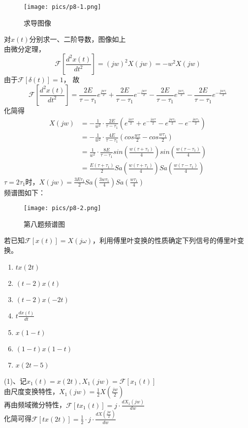 \documentclass[answers]{exam}  %
\begin{document}
\begin{questions}
\begin{figure}[h]
	\centering
	\texttt{[image: pics/p8-1.png]}
	\caption{求导图像}
\end{figure}
\begin{solution}
	对$x(t)$分别求一、二阶导数，图像如上\\
	由微分定理，$$\mathcal{F}[\frac{d^2x(t)}{dt^2}]=(jw)^2X(jw)=-w^2X(jw)$$
	由于$\mathcal{F}[\delta(t)]=1$，
	故$$\mathcal{F}[\frac{d^2x(t)}{dt^2}]=\frac{2E}{\tau-\tau_1}e^{\frac{jw\tau}{2}}+\frac{2E}{\tau-\tau_1}e^{-\frac
	{jw\tau}{2}}-\frac{2E}{\tau-\tau_1}e^{\frac{jw\tau_1}{2}}-\frac{2E}{\tau-\tau_1}e^{-\frac{jw\tau_1}{2}}$$
	化简得\begin{align*}
		X(jw)&=-\frac{1}{w^2}\cdot\frac{2E}{\tau-\tau_1}(e^{\frac{jw\tau}{2}}+e^{-\frac{jw\tau}{2}}-e^{\frac{jw\tau_1}{2}}-e^{-\frac{jw\tau_1}{2}})\\
		&=-\frac{1}{w^2}\cdot\frac{4E}{\tau-\tau_1}(cos\frac{w\tau}{2}-cos\frac{w\tau_1}{2})\\
		&=\frac{1}{w^2}\cdot\frac{8E}{\tau-\tau_1}sin(\frac{w(\tau+\tau_1)}{4})sin(\frac{w(\tau-\tau_1)}{4})\\
		&=\frac{E(\tau+\tau_1)}{2}Sa(\frac{w(\tau+\tau_1)}{4})Sa(\frac{w(\tau-\tau_1)}{4})
	\end{align*}
	$\tau=2\tau_1$时，$X(jw)=\frac{3E\tau_1}{2}Sa(\frac{3w\tau_1}{4})Sa(\frac{w\tau_1}{4})$\\
	频谱图如下：
\end{solution}

\begin{figure}[h]
	\centering
	\texttt{[image: pics/p8-2.png]}
	\caption{第八题频谱图}
\end{figure}
\newpage
\question 若已知$\mathcal{F}[x(t)] = X(j\omega)$，利用傅里叶变换的性质确定下列信号的傅里叶变换。
\begin{enumerate}[(1)]
	\item $tx(2t)$
	\item $(t-2)x(t)$
	\item $(t-2)x(-2t)$
	\item $t\frac{dx(t)}{dt}$
	\item $x(1-t)$
	\item $(1-t)x(1-t)$
	\item $x(2t-5)$
\end{enumerate}


\begin{solution}
	(1)、记$x_1(t)=x(2t),X_1(jw)=\mathcal{F}[x_1(t)]$\\
	由尺度变换特性，$X_1(jw)=\frac{1}{2}X(\frac{jw}{2})$\\
	再由频域微分特性，$\mathcal{F}[tx_1(t)]=j\cdot\frac{dX_1(jw)}{dw}$\\
	化简可得$\mathcal{F}[tx(2t)]=\frac{1}{2}\cdot j\cdot\frac{dX(\frac{jw}{2})}{dw}$\\


\end{solution}
\end{questions}
\end{document}
